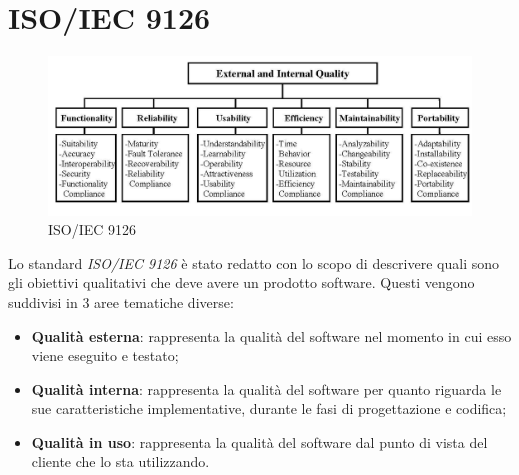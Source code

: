 \newpage
\section{ISO/IEC 9126}

\label{ISO/IEC 9126}
\begin{figure}[h]
\centering
\includegraphics[scale=0.3,keepaspectratio]{9126.png}
\caption{ISO/IEC 9126}
\end{figure}
\FloatBarrier

Lo standard \textit{ISO/IEC 9126} è stato redatto con lo scopo di descrivere quali sono gli obiettivi qualitativi che deve avere un prodotto software. Questi vengono suddivisi in 3 aree tematiche diverse:
\begin{itemize}
\item\textbf{Qualità esterna}: rappresenta la qualità del software nel momento in cui esso viene eseguito e testato;
\item\textbf{Qualità interna}: rappresenta la qualità del software per quanto riguarda le sue caratteristiche implementative, durante le fasi di progettazione e codifica; 
\item\textbf{Qualità in uso}: rappresenta la qualità del software dal punto di vista del cliente che lo sta utilizzando.
\end{itemize}


